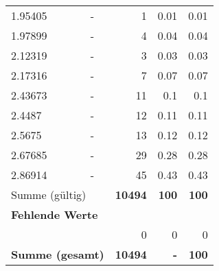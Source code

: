 \begin{longtable}{lXrrr}
        1.95405 & \multicolumn{1}{X}{-} & %
          \num{1} &
          \num[round-mode=places,round-precision=2]{0.01} &
          \num[round-mode=places,round-precision=2]{0.01} \\

        1.97899 & \multicolumn{1}{X}{-} & %
          \num{4} &
          \num[round-mode=places,round-precision=2]{0.04} &
          \num[round-mode=places,round-precision=2]{0.04} \\

        2.12319 & \multicolumn{1}{X}{-} & %
          \num{3} &
          \num[round-mode=places,round-precision=2]{0.03} &
          \num[round-mode=places,round-precision=2]{0.03} \\

        2.17316 & \multicolumn{1}{X}{-} & %
          \num{7} &
          \num[round-mode=places,round-precision=2]{0.07} &
          \num[round-mode=places,round-precision=2]{0.07} \\

        2.43673 & \multicolumn{1}{X}{-} & %
          \num{11} &
          \num[round-mode=places,round-precision=2]{0.1} &
          \num[round-mode=places,round-precision=2]{0.1} \\

        2.4487 & \multicolumn{1}{X}{-} & %
          \num{12} &
          \num[round-mode=places,round-precision=2]{0.11} &
          \num[round-mode=places,round-precision=2]{0.11} \\

        2.5675 & \multicolumn{1}{X}{-} & %
          \num{13} &
          \num[round-mode=places,round-precision=2]{0.12} &
          \num[round-mode=places,round-precision=2]{0.12} \\

        2.67685 & \multicolumn{1}{X}{-} & %
          \num{29} &
          \num[round-mode=places,round-precision=2]{0.28} &
          \num[round-mode=places,round-precision=2]{0.28} \\

        2.86914 & \multicolumn{1}{X}{-} & %
          \num{45} &
          \num[round-mode=places,round-precision=2]{0.43} &
          \num[round-mode=places,round-precision=2]{0.43} \\

     \midrule
     \multicolumn{2}{l}{Summe (gültig)} &
       \textbf{\num{10494}} &
     \textbf{\num{100}} &
       \textbf{\num[round-mode=places,round-precision=2]{100}} \\
     \multicolumn{5}{l}{\textbf{Fehlende Werte}}\\
      & & 0 & 0 & 0 \\
     \midrule
     \multicolumn{2}{l}{\textbf{Summe (gesamt)}} &
          \textbf{\num{10494}} &
        \textbf{-} &
        \textbf{\num{100}} \\
     \bottomrule
     \end{longtable}
     
